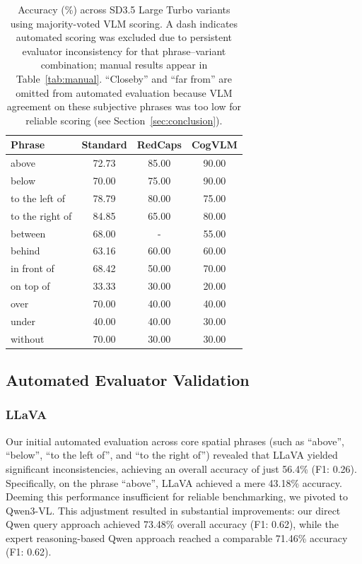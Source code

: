 \begin{table}[ht]
\caption{Accuracy (\%) across SD3.5 Large Turbo variants using majority-voted VLM scoring. A dash indicates automated scoring was excluded due to persistent evaluator inconsistency for that phrase--variant combination; manual results appear in Table~\ref{tab:manual}. ``Closeby'' and ``far from'' are omitted from automated evaluation because VLM agreement on these subjective phrases was too low for reliable scoring (see Section~\ref{sec:conclusion}).}
\label{tab:accuracy}
\begin{center}
\begin{small}
\begin{tabular}{lccc}
\toprule
\textbf{Phrase} & \textbf{Standard} & \textbf{RedCaps} & \textbf{CogVLM} \\
\midrule
above           & 72.73 & 85.00 & 90.00 \\
below           & 70.00 & 75.00 & 90.00 \\
to the left of  & 78.79 & 80.00 & 75.00 \\
to the right of & 84.85 & 65.00 & 80.00 \\
between         & 68.00 & -     & 55.00 \\
behind          & 63.16 & 60.00 & 60.00 \\
in front of     & 68.42 & 50.00 & 70.00 \\
on top of       & 33.33 & 30.00 & 20.00 \\
over            & 70.00 & 40.00 & 40.00 \\
under           & 40.00 & 40.00 & 30.00 \\
without         & 70.00 & 30.00 & 30.00 \\
\bottomrule
\end{tabular}
\end{small}
\end{center}
\end{table}


\subsection{Automated Evaluator Validation}
\subsubsection{LLaVA}
Our initial automated evaluation across core spatial phrases (such as ``above'', ``below'', ``to the left of'', and ``to the right of'') revealed that LLaVA yielded significant inconsistencies, achieving an overall accuracy of just 56.4\% (F1: 0.26). Specifically, on the phrase ``above'', LLaVA achieved a mere 43.18\% accuracy. Deeming this performance insufficient for reliable benchmarking, we pivoted to Qwen3-VL. This adjustment resulted in substantial improvements: our direct Qwen query approach achieved 73.48\% overall accuracy (F1: 0.62), while the expert reasoning-based Qwen approach reached a comparable 71.46\% accuracy (F1: 0.62).


